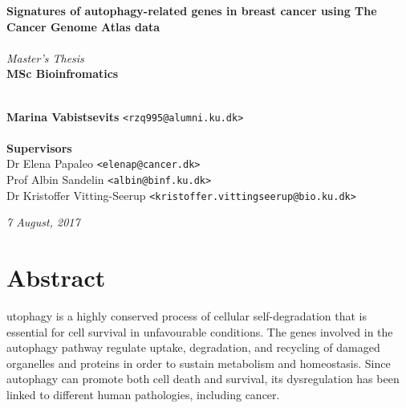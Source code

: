 \documentclass[10pt, openright,oneside]{book}
\begin{document}
\frontmatter
    \thispagestyle{empty}
    
    \vspace*{4.5cm} 
    \noindent \textbf{\huge Signatures of autophagy-related genes in breast cancer using The Cancer Genome Atlas data} \\
    \\[0.5cm]
    \textit{\Large Master's Thesis} \\
    [0.5cm]
    \textbf{\Large MSc Bioinfromatics} \\
    \vspace*{.1cm} \\
    \begin{tabbing}
    \textbf{Marina Vabistsevits} \hspace{1cm} \= \texttt{<rzq995@alumni.ku.dk>} \\
    \\[9cm]
    \textbf{\Large Supervisors} \\
    Dr Elena Papaleo \> \texttt{<elenap@cancer.dk>} \\
    Prof Albin Sandelin \> \texttt{<albin@binf.ku.dk>} \\
    Dr Kristoffer Vitting-Seerup\> \texttt{<kristoffer.vittingseerup@bio.ku.dk>}
    \\[1cm]
    
    \end{tabbing}
    \begin{center}
    \textit{7 August, 2017} 
    \end{center}

    \newpage
    \ClearWallPaper
    



\pagestyle{plain}

\tableofcontents

\mainmatter

\chapter*{Abstract}
utophagy is a highly conserved process of cellular self-degradation that is essential for cell
survival in unfavourable conditions. The genes involved in the autophagy pathway regulate
uptake, degradation, and recycling of damaged organelles and proteins in order to sustain
metabolism and homeostasis. Since autophagy can promote both cell death and survival, its
dysregulation has been linked to different human pathologies, including cancer.
\end{document}
